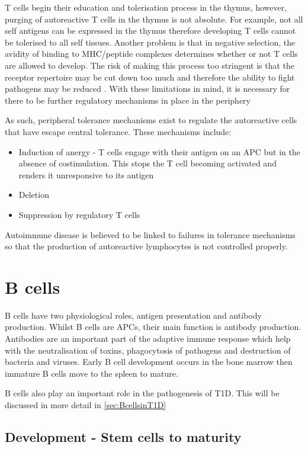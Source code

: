 T cells begin their education and tolerisation process in the thymus, however, purging of autoreactive T cells in the thymus is not absolute.
For example, not all self antigens can be expressed in the thymus therefore developing T cells cannot be tolerised to all self tissues.
Another problem is that in negative selection, the avidity of binding to MHC/peptide complexes determines whether or not T cells are allowed to develop.
The risk of making this process too stringent is that the receptor repertoire may be cut down too much and therefore the ability to fight pathogens may be reduced \citep{Walker2002}.
With these limitations in mind, it is necessary for there to be further regulatory mechanisms in place in the periphery

As such, peripheral tolerance mechanisms exist to regulate the autoreactive cells that have escape central tolerance.
These mechanisms include:
\begin{itemize}
\item Induction of anergy - T cells engage with their antigen on an APC but in the absence of costimulation. This stops the T cell becoming activated and renders it unresponsive to its antigen\citep{Abbas2004}
\item Deletion\citep{Abbas2004}
\item Suppression by regulatory T cells\citep{Abbas2004}
\end{itemize}

Autoimmune disease is believed to be linked to failures in tolerance mechanisms so that the production of autoreactive lymphocytes is not controlled properly.

\section{B cells}


B cells have two physiological roles, antigen presentation and antibody production.
Whilst B cells are APCs, their main function is antibody production.
Antibodies are an important part of the adaptive immune response which help with the neutralisation of toxins, phagocytosis of pathogens and destruction of bacteria and viruses.
Early B cell development occurs in the bone marrow then immature B cells move to the spleen to mature.

B cells also play an important role in the pathogenesis of T1D. 
This will be discussed in more detail in \cref{sec:BcellsinT1D}

\subsection{Development - Stem cells to maturity}
\label{subsec:Bcelldevelopment}
